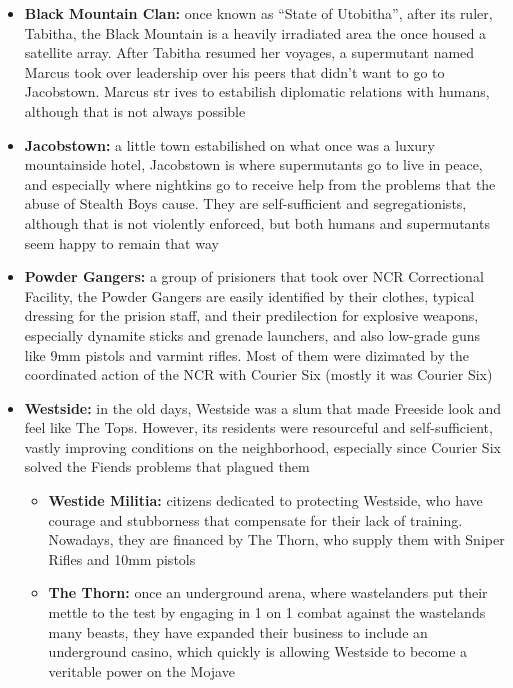 \documentclass[11pt]{article} %
\begin{document}
\begin{itemize}
	\item \textbf{Black Mountain Clan:} once known as ``State of Utobitha'', after its ruler, Tabitha, the Black Mountain is a heavily irradiated area the once housed a satellite array. After Tabitha resumed her voyages, a supermutant named Marcus took over leadership over his peers that didn't want to go to Jacobstown. Marcus str
	ives to estabilish diplomatic relations with humans, although that is not always possible
	
	\item \textbf{Jacobstown:} a little town estabilished on what once was a luxury mountainside hotel, Jacobstown is where supermutants go to live in peace, and especially where nightkins go to receive help from the problems that the abuse of Stealth Boys cause. They are self-sufficient and segregationists, although that is not violently enforced, but both humans and supermutants seem happy to remain that way
	
	\item \textbf{Powder Gangers:} a group of prisioners that took over NCR Correctional Facility, the Powder Gangers are easily identified by their clothes, typical dressing for the prision staff, and their predilection for explosive weapons, especially dynamite sticks and grenade launchers, and also low-grade guns like 9mm pistols and varmint rifles. Most of them were dizimated by the coordinated action of the NCR with Courier Six (mostly it was Courier Six)
	
	\item \textbf{Westside:} in the old days, Westside was a slum that made Freeside look and feel like The Tops. However, its residents were resourceful and self-sufficient, vastly improving conditions on the neighborhood, especially since Courier Six solved the Fiends problems that plagued them
	\begin{itemize}
		\item \textbf{Westide Militia:} citizens dedicated to protecting Westside, who have courage and stubborness that compensate for their lack of training. Nowadays, they are financed by The Thorn, who supply them with Sniper Rifles and 10mm pistols
		
		\item \textbf{The Thorn:} once an underground arena, where wastelanders put their mettle to the test by engaging in 1 on 1 combat against the wastelands many beasts, they have expanded their business to include an underground casino, which quickly is allowing Westside to become a veritable power on the Mojave
	\end{itemize} 


\end{itemize}
\end{document}
